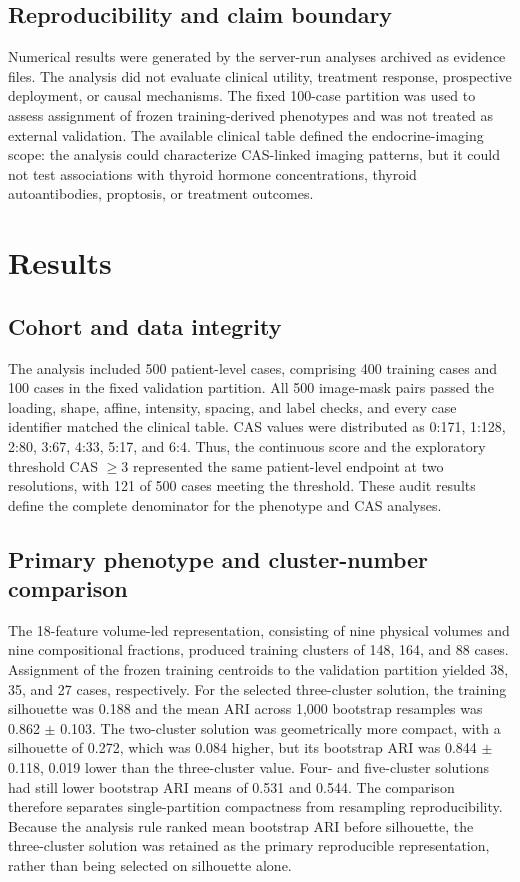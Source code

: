 \documentclass[utf8]{FrontiersinVancouver}
\begin{document}
\subsection{Reproducibility and claim boundary}
Numerical results were generated by the server-run analyses archived as evidence files. The analysis did not evaluate clinical utility, treatment response, prospective deployment, or causal mechanisms. The fixed 100-case partition was used to assess assignment of frozen training-derived phenotypes and was not treated as external validation. The available clinical table defined the endocrine-imaging scope: the analysis could characterize CAS-linked imaging patterns, but it could not test associations with thyroid hormone concentrations, thyroid autoantibodies, proptosis, or treatment outcomes.

\section{Results}
\subsection{Cohort and data integrity}
The analysis included 500 patient-level cases, comprising 400 training cases and 100 cases in the fixed validation partition. All 500 image-mask pairs passed the loading, shape, affine, intensity, spacing, and label checks, and every case identifier matched the clinical table. CAS values were distributed as 0:171, 1:128, 2:80, 3:67, 4:33, 5:17, and 6:4. Thus, the continuous score and the exploratory threshold CAS $\geq3$ represented the same patient-level endpoint at two resolutions, with 121 of 500 cases meeting the threshold. These audit results define the complete denominator for the phenotype and CAS analyses.

\subsection{Primary phenotype and cluster-number comparison}
The 18-feature volume-led representation, consisting of nine physical volumes and nine compositional fractions, produced training clusters of 148, 164, and 88 cases. Assignment of the frozen training centroids to the validation partition yielded 38, 35, and 27 cases, respectively. For the selected three-cluster solution, the training silhouette was 0.188 and the mean ARI across 1,000 bootstrap resamples was 0.862 $\pm$ 0.103. The two-cluster solution was geometrically more compact, with a silhouette of 0.272, which was 0.084 higher, but its bootstrap ARI was 0.844 $\pm$ 0.118, 0.019 lower than the three-cluster value. Four- and five-cluster solutions had still lower bootstrap ARI means of 0.531 and 0.544. The comparison therefore separates single-partition compactness from resampling reproducibility. Because the analysis rule ranked mean bootstrap ARI before silhouette, the three-cluster solution was retained as the primary reproducible representation, rather than being selected on silhouette alone.
\end{document}
